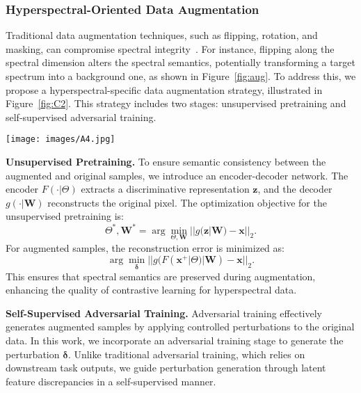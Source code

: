 \subsubsection{Hyperspectral-Oriented Data Augmentation}\label{sec3.1.3}
Traditional data augmentation techniques, such as flipping, rotation, and masking, can compromise spectral integrity~\cite{Liu12024}. For instance, flipping along the spectral dimension alters the spectral semantics, potentially transforming a target spectrum into a background one, as shown in Figure~\ref{fig:aug}. 
To address this, we propose a hyperspectral-specific data augmentation strategy, illustrated in Figure~\ref{fig:C2}. This strategy includes two stages: unsupervised pretraining and self-supervised adversarial training.

\begin{figure*}[!t]             
    \centering               
    \texttt{[image: images/A4.jpg]}                
    \caption{The process of using adversarial training for hyperspectral data augmentation.}             
    \label{fig:C2}   
\end{figure*}
\textbf{Unsupervised Pretraining.} To ensure semantic consistency between the augmented and original samples, we introduce an encoder-decoder network. 
The encoder $F(\cdot|\Theta)$ extracts a discriminative representation $\bm{z}$, and the decoder $g(\cdot|\bm{W})$ reconstructs the original pixel. The optimization objective for the unsupervised pretraining is:
\begin{equation}\label{eq:8-1}
    \Theta^{\ast}, \bm{W}^{\ast} = \arg\min\limits_{\Theta, \bm{W}} ||g(\bm{z}|\bm{W}) - \bm{x}||_2.
\end{equation}
For augmented samples, the reconstruction error is minimized as:
\begin{equation}\label{eq:10}
    \arg\min\limits_{\bm{\delta}} ||g(F(\bm{x}^{+}|\Theta)|\bm{W}) - \bm{x}||_2.
\end{equation}
This ensures that spectral semantics are preserved during augmentation, enhancing the quality of contrastive learning for hyperspectral data.
\par
\textbf{Self-Supervised Adversarial Training.} 
Adversarial training effectively generates augmented samples by applying controlled perturbations to the original data. In this work, we incorporate an adversarial training stage to generate the perturbation $\bm{\delta}$. Unlike traditional adversarial training, which relies on downstream task outputs, we guide perturbation generation through latent feature discrepancies in a self-supervised manner.


